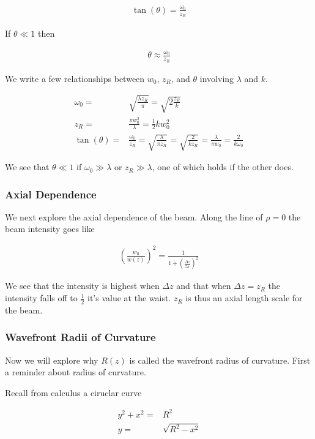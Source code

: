 \documentclass[12pt]{article}
\begin{document}
\begin{align}
\tan(\theta) = \frac{\omega_0}{z_R}
\end{align}

If $\theta \ll 1$ then

\begin{align}
\theta \approx \frac{\omega_0}{z_R}
\end{align}

We write a few relationships between $w_0$, $z_R$, and $\theta$ involving $\lambda$ and $k$.

\begin{align}
\omega_0 =& \sqrt{\frac{\lambda z_R}{\pi}} = \sqrt{2 \frac{z_R}{k}}\\
z_R =& \frac{\pi w_0^2}{\lambda} = \frac{1}{2} k w_0^2\\
\tan(\theta) =& \frac{\omega_0}{z_R} = \sqrt{\frac{\lambda}{\pi z_R}} = \sqrt{\frac{2}{k z_R}} = \frac{\lambda}{\pi w_0} = \frac{2}{k\omega_0}
\end{align}

We see that $\theta \ll 1$ if $\omega_0 \gg \lambda$ or $z_R \gg \lambda$, one of which holds if the other does.

\subsubsection{Axial Dependence}

We next explore the axial dependence of the beam.
Along the line of $\rho=0$ the beam intensity goes like

\begin{align}
\left(\frac{w_0}{w(z)}\right)^2 = \frac{1}{1 + \left(\frac{\Delta z}{z_R}\right)^2}
\end{align}

We see that the intensity is highest when $\Delta z$ and that when $\Delta z=z_R$ the intensity falls off to $\frac{1}{2}$ it's value at the waist.
$z_R$ is thus an axial length scale for the beam.

\subsubsection{Wavefront Radii of Curvature}

Now we will explore why $R(z)$ is called the wavefront radius of curvature.
First a reminder about radius of curvature.

Recall from calculus a ciruclar curve

\begin{align}
y^2 + x^2 =& R^2\\
y =& \sqrt{R^2 - x^2}
\end{align}
\end{document}
